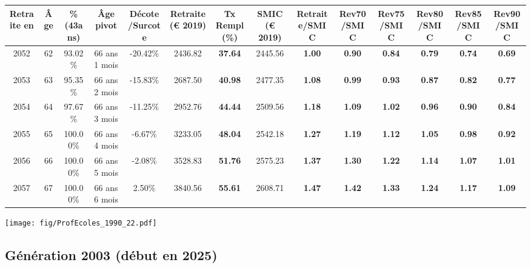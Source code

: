 \begin{adjustbox}{max width=\textwidth} 
\begin{tabular}[htb]{|c|c||c|c|c||c|c||c||c|c|c|c|c|c|} 
\hline 
 Retraite en &  Âge &  \%(43ans) &  Âge pivot &  Décote/Surcote &  Retraite (\euro{} 2019) &  Tx Rempl(\%) &  SMIC (\euro{} 2019) &  Retraite/SMIC &  Rev70/SMIC &  Rev75/SMIC &  Rev80/SMIC &  Rev85/SMIC &  Rev90/SMIC \\ 
\hline \hline 
 2052 &  62 &  93.02\% &  66 ans 1 mois &  -20.42\% &  2436.82 &  {\bf 37.64} &  2445.56 &  {\bf {\color{red} 1.00}} &  {\bf {\color{red} 0.90}} &  {\bf {\color{red} 0.84}} &  {\bf {\color{red} 0.79}} &  {\bf {\color{red} 0.74}} &  {\bf {\color{red} 0.69}} \\ 
\hline 
 2053 &  63 &  95.35\% &  66 ans 2 mois &  -15.83\% &  2687.50 &  {\bf 40.98} &  2477.35 &  {\bf 1.08} &  {\bf {\color{red} 0.99}} &  {\bf {\color{red} 0.93}} &  {\bf {\color{red} 0.87}} &  {\bf {\color{red} 0.82}} &  {\bf {\color{red} 0.77}} \\ 
\hline 
 2054 &  64 &  97.67\% &  66 ans 3 mois &  -11.25\% &  2952.76 &  {\bf 44.44} &  2509.56 &  {\bf 1.18} &  {\bf 1.09} &  {\bf 1.02} &  {\bf {\color{red} 0.96}} &  {\bf {\color{red} 0.90}} &  {\bf {\color{red} 0.84}} \\ 
\hline 
 2055 &  65 &  100.00\% &  66 ans 4 mois &  -6.67\% &  3233.05 &  {\bf 48.04} &  2542.18 &  {\bf 1.27} &  {\bf 1.19} &  {\bf 1.12} &  {\bf 1.05} &  {\bf {\color{red} 0.98}} &  {\bf {\color{red} 0.92}} \\ 
\hline 
 2056 &  66 &  100.00\% &  66 ans 5 mois &  -2.08\% &  3528.83 &  {\bf 51.76} &  2575.23 &  {\bf 1.37} &  {\bf 1.30} &  {\bf 1.22} &  {\bf 1.14} &  {\bf 1.07} &  {\bf 1.01} \\ 
\hline 
 2057 &  67 &  100.00\% &  66 ans 6 mois &  2.50\% &  3840.56 &  {\bf 55.61} &  2608.71 &  {\bf 1.47} &  {\bf 1.42} &  {\bf 1.33} &  {\bf 1.24} &  {\bf 1.17} &  {\bf 1.09} \\ 
\hline 
\hline 
\end{tabular} 
\end{adjustbox} 
 
 \vspace{0.1cm} 

 \begin{center}\texttt{[image: fig/ProfEcoles\_1990\_22.pdf]}\end{center} \label{fig/ProfEcoles_1990_22.pdf} 

\newpage 
 
\subsection{Génération 2003 (début en 2025)} 

